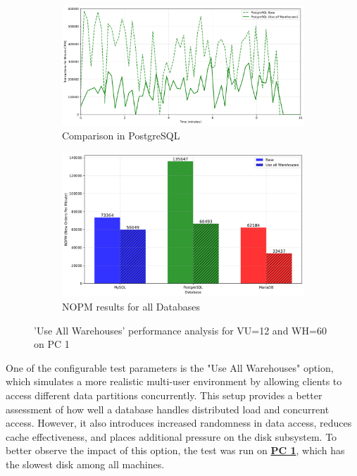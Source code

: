 \begin{figure}[H]
    \hspace*{-1.7cm}
    \begin{subfigure}[b]{0.6\textwidth}
        \centering
        \includegraphics[width=\linewidth]{Images/database_count_comparison_PostgreSQL.png}
        \caption{Comparison in PostgreSQL}
        \label{fig:all-wh-pg}
    \end{subfigure}%
    \begin{subfigure}[b]{0.6\textwidth}
        \centering
        \includegraphics[width=\linewidth]{Images/hammerdb_summary_comparison_vu12.png}
        \caption{NOPM results for all Databases}
        \label{fig:all-wh-summary}
    \end{subfigure}

    \caption{'Use All Warehouses' performance analysis for VU=12 and WH=60 on PC 1}
    \label{fig:all-wh}
\end{figure}

One of the configurable test parameters is the "Use All Warehouses" option, which simulates a more realistic multi-user environment by allowing clients to access different data partitions concurrently. This setup provides a better assessment of how well a database handles distributed load and concurrent access. However, it also introduces increased randomness in data access, reduces cache effectiveness, and places additional pressure on the disk subsystem. To better observe the impact of this option, the test was run on \textbf{\hyperref[tab:hardware-setup]{PC 1}}, which has the slowest disk among all machines.\\

